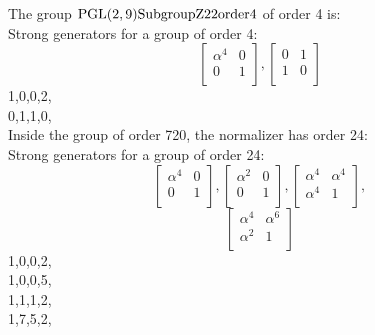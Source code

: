 \noindent The group ${\rm PGL}(2,9){\rm Subgroup Z22 order 4}$ of order 4 is:\\
Strong generators for a group of order 4:
$$
\left[
\begin{array}{*{2}{r}}
\alpha^{4} & 0\\
0 & 1\\
\end{array}
\right]
, 
\left[
\begin{array}{*{2}{r}}
0 & 1\\
1 & 0\\
\end{array}
\right]
$$
1,0,0,2,\\
0,1,1,0,\\
\bigskip
Inside the group of order 720, the normalizer has order 24:\\
Strong generators for a group of order 24:
$$
\left[
\begin{array}{*{2}{r}}
\alpha^{4} & 0\\
0 & 1\\
\end{array}
\right]
, 
\left[
\begin{array}{*{2}{r}}
\alpha^{2} & 0\\
0 & 1\\
\end{array}
\right]
, 
\left[
\begin{array}{*{2}{r}}
\alpha^{4} & \alpha^{4}\\
\alpha^{4} & 1\\
\end{array}
\right]
, 
$$
$$
\left[
\begin{array}{*{2}{r}}
\alpha^{4} & \alpha^{6}\\
\alpha^{2} & 1\\
\end{array}
\right]
$$
1,0,0,2,\\
1,0,0,5,\\
1,1,1,2,\\
1,7,5,2,\\

